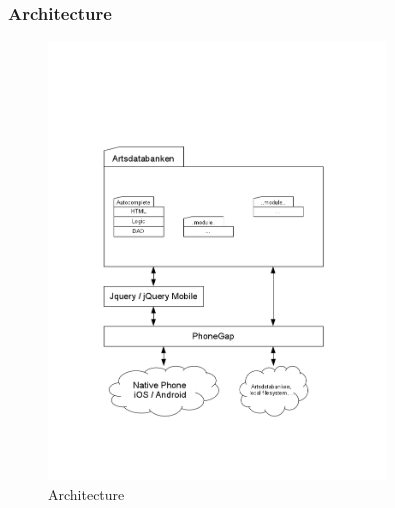 \subsubsection{Architecture}

\begin{figure}[htb]
	\centering
	\includegraphics[trim=3cm 4cm 4cm 8cm, clip=true, width=0.8\textwidth]{implementation/architecture/architecture.png}
	\caption{Architecture}
	\label{fig:architecture}
\end{figure}
\newpage
